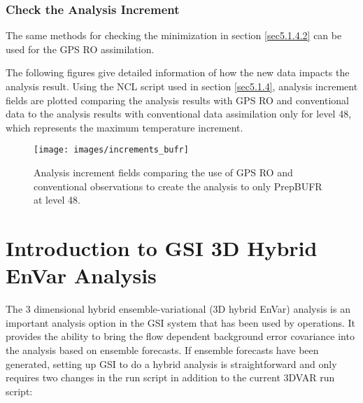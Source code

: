 \subsubsection{Check the Analysis Increment}

The same methods for checking the minimization in section \ref{sec5.1.4.2} can be used for the GPS RO assimilation. 

The following figures give detailed information of how the new data impacts the analysis result.  Using the NCL script used in section \ref{sec5.1.4}, analysis increment fields are plotted comparing the analysis results with GPS RO and conventional data to the analysis results with conventional data assimilation only for level 48, which represents the maximum temperature increment.  

\begin{figure}[h!]
  \centering
  \texttt{[image: images/increments\_bufr]}
  \caption{Analysis increment fields comparing the use of GPS RO and conventional observations to create the analysis to only PrepBUFR at level 48.}
  \label{fig:increments_bufr}
\end{figure}

\section{Introduction to GSI 3D Hybrid EnVar Analysis}

The 3 dimensional hybrid ensemble-variational (3D hybrid EnVar) analysis is an important analysis option in the GSI system that has been used by operations. It provides the ability to bring the flow dependent background error covariance into the analysis based on ensemble forecasts. If ensemble forecasts have been generated, setting up GSI to do a hybrid analysis is straightforward and only requires two changes in the run script in addition to the current 3DVAR run script:

